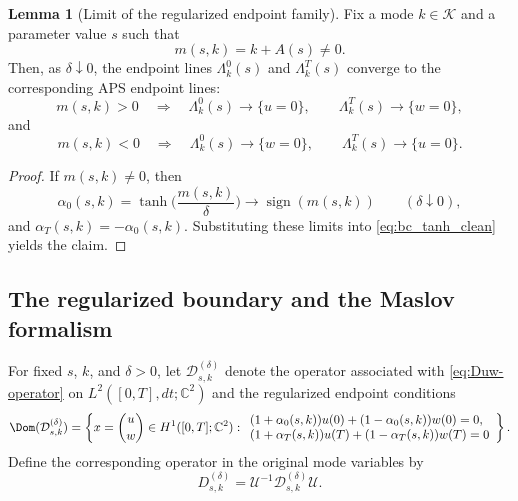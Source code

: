 \documentclass[11pt]{article}
\theoremstyle{definition}
\newtheorem{lemma}[theorem]{Lemma}
\DeclareMathOperator{\sign}{sign}
\numberwithin{equation}{section}
\begin{document}
\begin{lemma}[Limit of the regularized endpoint family]
\label{lem:sharp-limit-regularized}
Fix a mode \(k\in\mathcal K\) and a parameter value \(s\) such that
\begin{equation}
m(s,k)=k+A(s)\neq 0.
\end{equation}
Then, as \(\delta\downarrow 0\), the endpoint lines \(\Lambda_k^0(s)\) and \(\Lambda_k^T(s)\) converge to the corresponding APS endpoint lines:
\begin{equation}
m(s,k)>0
\quad\Longrightarrow\quad
\Lambda_k^0(s)\to\{u=0\},\qquad
\Lambda_k^T(s)\to\{w=0\},
\end{equation}
and
\begin{equation}
m(s,k)<0
\quad\Longrightarrow\quad
\Lambda_k^0(s)\to\{w=0\},\qquad
\Lambda_k^T(s)\to\{u=0\}.
\end{equation}
\end{lemma}

\begin{proof}
If \(m(s,k)\neq 0\), then
\begin{equation}
\alpha_0(s,k)=\tanh\!\Big(\frac{m(s,k)}{\delta}\Big)\longrightarrow \sign(m(s,k))
\qquad (\delta\downarrow 0),
\end{equation}
and \(\alpha_T(s,k)=-\alpha_0(s,k)\). Substituting these limits into \eqref{eq:bc_tanh_clean} yields the claim.
\end{proof}

\subsection{The regularized boundary and the Maslov formalism}\label{subsec:regularized_realizations_maslov}

For fixed \(s\), \(k\), and \(\delta>0\), let \(\mathcal D^{(\delta)}_{s,k}\) denote the operator associated with \eqref{eq:Duw-operator} on \(L^2([0,T],dt;\mathbb C^2)\) and the regularized endpoint conditions
\begin{equation}
\Dom(\mathcal D^{(\delta)}_{s,k})
=
\left\{
x=\binom{u}{w}\in H^1([0,T];\mathbb C^2):
\begin{array}{l}
(1+\alpha_0(s,k))u(0)+(1-\alpha_0(s,k))w(0)=0,\\
(1+\alpha_T(s,k))u(T)+(1-\alpha_T(s,k))w(T)=0
\end{array}
\right\}.
\end{equation}
Define the corresponding operator in the original mode variables by
\begin{equation}
D^{(\delta)}_{s,k} =\mathcal U^{-1}\mathcal D^{(\delta)}_{s,k}\mathcal U.
\end{equation}
\end{document}
